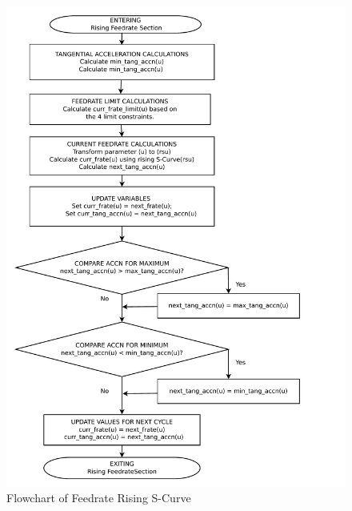 \clearpage
\pagebreak

\begin{figure}
	\caption{Flowchart of Feedrate Rising S-Curve}
	\label{01-Feedrate-Rising-Region-flowchart.pdf}
	\centering
	\includegraphics[width=1.10\textwidth,]{Images/Chap3/01-Feedrate-Rising-Region-flowchart.pdf} 
\end{figure}


\clearpage
\pagebreak

